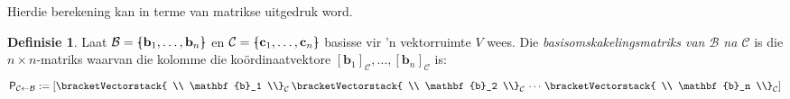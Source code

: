 \documentclass[a4paper,11pt]{book}
\theoremstyle{definition}
\newtheorem{definition}[theorem]{Definisie}
\newcommand{\ve}[1]{\mathbf{#1}}
\newcommand{\mat}[1]{\mathsf{#1}}
\newcommand{\basis}[1]{{\mathcal #1}}
\newcommand{\cvector}[1]{\bracketVectorstack{#1}}
\newcommand{\bmark}{\raisebox{.53ex}{\rule{.2em}{.1ex}}}
\newcommand{\bopen}{{\protect\ooalign{\{\cr\hfil\bmark\hfil\cr}}}
\newcommand{\bclose}{{\protect\ooalign{\}\cr\hfil\bmark\hfil\cr}}}
\begin{document}
Hierdie berekening kan in terme van matrikse uitgedruk word.
\begin{definition} Laat $\basis{B} = \bopen \ve{b}_1, \ldots, \ve{b}_n
	\bclose$ en $\basis{C} = \bopen \ve{c}_1, \ldots, \ve{c}_n \bclose$
	basisse vir 'n vektorruimte $V$ wees. Die
	\emph{basisomskakelingsmatriks van $\basis{B}$ na $\basis{C}$} is die
	$n \times n$-matriks waarvan die kolomme die ko{\"o}rdinaatvektore
	$[\ve{b}_1]_\basis{C}, \ldots, [\ve{b}_n]_\basis{C}$ is:
	\[
		\mat{P}_{\basis{C} \leftarrow \basis{B}} := \left[ \cvector{ \\
		\ve{b}_1 \\}_\basis{C} \,  \cvector{ \\ \ve{b}_2 \\}_\basis{C} \,
		\cdots \, \cvector{ \\ \ve{b}_n \\}_\basis{C}\right]
	\]
\end{definition}
\end{document}
